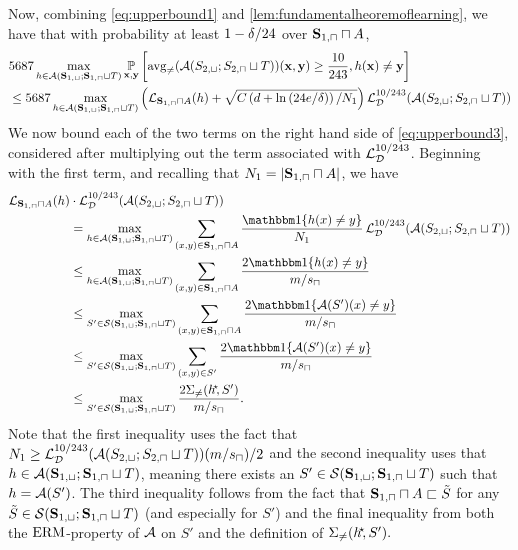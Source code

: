 \begin{proofof}{}
Now, combining \cref{eq:upperbound1} and \cref{lem:fundamentalheoremoflearning}, we have that with probability at least $ 1-\delta/24 $ over $ \mathbf{S}_{1,\sqcap}\sqcap A$,
\begin{align}\label{eq:upperbound3}
  &5687\max_{h\in \mathcal{A}(\mathbf{S}_{1,\sqcup};\mathbf{S}_{1,\sqcap}\sqcup T)}\operatorname*{\mathbb{P}}_{\mathbf{x},\mathbf{y}} \left[ \operatorname{\mathrm{avg}_{\not=}}(\mathcal{A}(S_{2,\sqcup};S_{2,\sqcap}\sqcup T))(\mathbf{x},\mathbf{y})\geq \frac{10}{243}, h(\mathbf{x})\not=\mathbf{y} \right] 
    \\
  &\leq
    5687\max_{h\in \mathcal{A}(\mathbf{S}_{1,\sqcup};\mathbf{S}_{1,\sqcap}\sqcup T)}\left(\operatorname{\mathcal{L}}_{ \mathbf{S}_{1,\sqcap}\sqcap A}(h)+\sqrt{C\left(d+\ln{(24e/\delta )}\right)/N_1}\right) \operatorname{\mathcal{L}}_{\mathcal{D}}^{10/243}(\mathcal{A}(S_{2,\sqcup};S_{2,\sqcap}\sqcup T))\nonumber
\end{align}
We now bound each of the two terms on the right hand side of \cref{eq:upperbound3}, considered after multiplying out the term associated with $\operatorname{\mathcal{L}}_{\mathcal{D}}^{10/243}$. Beginning with the first term, and recalling that $ N_{1}=|\mathbf{S}_{1,\sqcap}\sqcap A|$, we have  
\begin{align}\label{eq:upperbound17}
\ls_{ \rS_{1,\sqcap}\sqcap A}(h) & \cdot \ls_{\cD}^{10/243}(\erm(S_{2,\sqcup};S_{2,\sqcap}\sqcup T)) \nonumber \\
    &=\max_{h\in \erm(\rS_{1,\sqcup};\rS_{1,\sqcap}\sqcup T)}\sum_{(x,y)\in \rS_{1,\sqcap}\sqcap A}\frac{\ind\{ h(x)\not=y \}}{N_{1}}  \ls_{\cD}^{10/243}(\erm(S_{2,\sqcup};S_{2,\sqcap}\sqcup T))\nonumber
    \\
    &\leq
    \max_{h\in \erm(\rS_{1,\sqcup};\rS_{1,\sqcap}\sqcup T)}\sum_{(x,y)\in \rS_{1,\sqcap}\sqcap A}\frac{2\ind\{ h(x)\not=y \}}{m/s_{\sqcap}} \nonumber \\
    &\leq
    \max\limits_{S'\in \cS(\rS_{1,\sqcup};\rS_{1,\sqcap}\sqcup T)}\sum_{(x,y)\in \rS_{1,\sqcap}\sqcap A}\frac{2\ind\{ \erm(S')(x)\not=y \}}{m/s_{\sqcap}} \nonumber
    \\
    &\leq
     \max\limits_{S'\in \cS(\rS_{1,\sqcup};\rS_{1,\sqcap}\sqcup T)}\sum\limits_{(x,y)\in S'}\frac{2\ind\{ \erm(S')(x)\not=y \}}{m/s_{\sqcap}}  \nonumber \\
    &\leq
    \max\limits_{S'\in \cS(\rS_{1,\sqcup};\rS_{1,\sqcap}\sqcup T)}\frac{2\Sigma_{\not=}(\hs\negmedspace,S')}{ m/s_{\sqcap}}.
\end{align}
Note that the first inequality uses the fact that $ N_1\geq \operatorname{\mathcal{L}}_{\mathcal{D}}^{10/243}(\mathcal{A}(S_{2,\sqcup};S_{2,\sqcap}\sqcup T))(m/s_{\sqcap})/2$ and the second inequality uses that $h\in\mathcal{A}(\mathbf{S}_{1,\sqcup};\mathbf{S}_{1,\sqcap}\sqcup T)$, meaning there exists an $ S'\in\mathcal{S}(\mathbf{S}_{1,\sqcup};\mathbf{S}_{1,\sqcap}\sqcup T)$ such that $h=\mathcal{A}(S')$. The third inequality follows from the fact that $\mathbf{S}_{1,\sqcap}\sqcap A \sqsubset \tilde{S} $ for any $ \tilde{S}\in \mathcal{S}(\mathbf{S}_{1,\sqcup};\mathbf{S}_{1,\sqcap}\sqcup T)$ (and especially for $S'$) and the final inequality from both the $ \mathrm{ERM} $-property of $ \mathcal{A} $  on $ S' $ and the definition of $ \Sigma_{\not=}(h^{\negmedspace\star}\negmedspace,S').$


\end{proofof}
